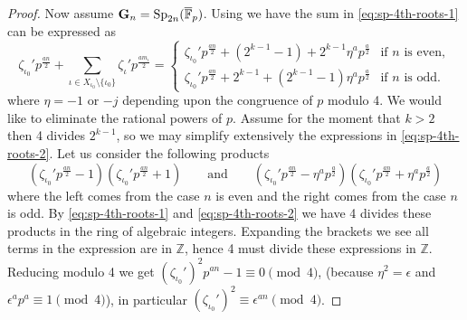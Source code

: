 \documentclass{jt-calcs}
\renewcommand{\cref}{\Cref}
\begin{document}
\begin{proof}
Now assume $\mathbf{G}_n = \operatorname{Sp}_{2n}(\overline{\mathbb{F}}_p)$. Using \cref{lem:sp-odd-even} we have the sum in \eqref{eq:sp-4th-roots-1} can be expressed as
\begin{equation}\label{eq:sp-4th-roots-2}
\zeta_{\iota_0}'p^{\frac{an}{2}} + \sum_{\iota \in X_{\iota_0}\setminus \{\iota_0\}} \zeta_{\iota}' p^{\frac{am_{\iota}}{2}} = \begin{cases}
\zeta_{\iota_0}'p^{\frac{an}{2}} + (2^{k-1}-1) +2^{k-1}\eta^a p^{\frac{a}{2}} &\text{if }n\text{ is even},\\
\zeta_{\iota_0}'p^{\frac{an}{2}} + 2^{k-1} + (2^{k-1}-1)\eta^a p^{\frac{a}{2}} &\text{if }n\text{ is odd}.
\end{cases}
\end{equation}
where $\eta = -1$ or $-j$ depending upon the congruence of $p$ modulo 4. We would like to eliminate the rational powers of $p$. Assume for the moment that $k > 2$ then 4 divides $2^{k-1}$, so we may simplify extensively the expressions in \eqref{eq:sp-4th-roots-2}. Let us consider the following products
\begin{equation*}
(\zeta_{\iota_0}'p^{\frac{an}{2}} - 1)(\zeta_{\iota_0}'p^{\frac{an}{2}} + 1) \qquad\text{and}\qquad (\zeta_{\iota_0}'p^{\frac{an}{2}} - \eta^ap^{\frac{a}{2}})(\zeta_{\iota_0}'p^{\frac{an}{2}} + \eta^ap^{\frac{a}{2}})
\end{equation*}
where the left comes from the case $n$ is even and the right comes from the case $n$ is odd. By \eqref{eq:sp-4th-roots-1} and \eqref{eq:sp-4th-roots-2} we have 4 divides these products in the ring of algebraic integers. Expanding the brackets we see all terms in the expression are in $\mathbb{Z}$, hence 4 must divide these expressions in $\mathbb{Z}$. Reducing modulo 4 we get $(\zeta_{\iota_0}')^2p^{an} - 1 \equiv 0 \pmod{4}$, (because $\eta^2 = \epsilon$ and $\epsilon^ap^a \equiv 1 \pmod{4}$), in particular $(\zeta_{\iota_0}')^2 \equiv \epsilon^{an} \pmod{4}$.


\end{proof}
\end{document}
